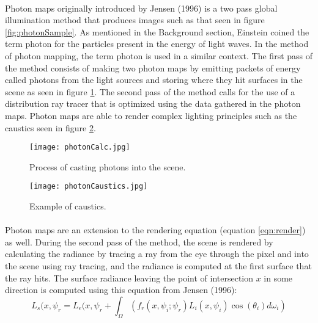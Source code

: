 \paragraph{}
Photon maps originally introduced by Jensen (1996) is a two pass global illumination method that produces images such as that seen in figure \ref{fig:photonSample}.  As mentioned in the Background section, Einstein coined the term photon for the particles present in the energy of light waves.  In the method of photon mapping, the term photon is used in a similar context.  The first pass of the method consists of making two photon maps by emitting packets of energy called photons from the light sources and storing where they hit surfaces in the scene as seen in figure \ref{fig:photonCalc}.  The second pass of the method calls for the use of a distribution ray tracer that is optimized using the data gathered in the photon maps.  Photon maps are able to render complex lighting principles such as the caustics seen in figure \ref{fig:photonCaustics}.

\begin{figure}[h!]
  \centering
    \texttt{[image: photonCalc.jpg]}
  \caption{Process of casting photons into the scene.}
	\label{fig:photonCalc}
\end{figure}

\begin{figure}[h!]
  \centering
    \texttt{[image: photonCaustics.jpg]}
  \caption{Example of caustics.}
	\label{fig:photonCaustics}
\end{figure}

\paragraph{}
Photon maps are an extension to the rendering equation (equation \ref{eqn:render}) as well.  During the second pass of the method, the scene is rendered by calculating the radiance by tracing a ray from the eye through the pixel and into the scene using ray tracing, and the radiance is computed at the first surface that the ray hits.  The surface radiance leaving the point of intersection $x$ in some direction is computed using this equation from Jensen (1996):
\begin{equation}
L_{s}(x,\psi_{r} = L_{e}(x,\psi_{r} + \int_{\Omega}(f_{r}(x,\psi_{i};\psi_{r})L_{i}(x,\psi_{i})\cos(\theta_{i})d\omega_{i}) \label{eqn:photon1}
\end{equation}

